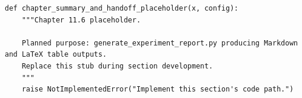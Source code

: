 \begin{lstlisting}[style=bookpython,caption={Planned code placeholder for chapter summary and handoff.},label={lst:ch11-chapter-summary-and-handoff}]
def chapter_summary_and_handoff_placeholder(x, config):
    """Chapter 11.6 placeholder.

    Planned purpose: generate_experiment_report.py producing Markdown and LaTeX table outputs.
    Replace this stub during section development.
    """
    raise NotImplementedError("Implement this section's code path.")
\end{lstlisting}
